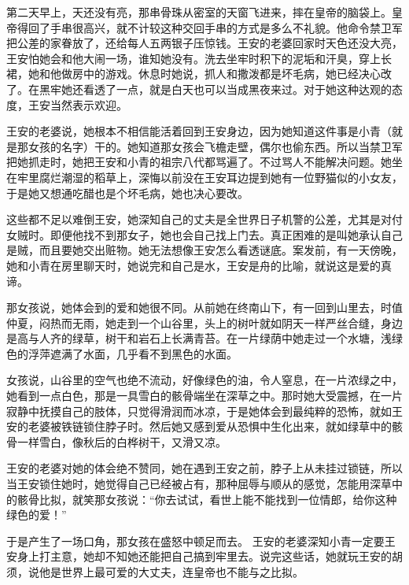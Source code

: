 第二天早上，天还没有亮，那串骨珠从密室的天窗飞进来，摔在皇帝的脑袋上。皇帝得回了手串很高兴，就不计较这种交回手串的方式是多么不礼貌。他命令禁卫军把公差的家眷放了，还给每人五两银子压惊钱。王安的老婆回家时天色还没大亮，王安怕她会和他大闹一场，谁知她没有。洗去坐牢时积下的泥垢和汗臭，穿上长裙，她和他做房中的游戏。休息时她说，抓人和撒泼都是坏毛病，她已经决心改了。在黑牢她还看透了一点，就是白天也可以当成黑夜来过。对于她这种达观的态度，王安当然表示欢迎。 

王安的老婆说，她根本不相信能活着回到王安身边，因为她知道这件事是小青（就是那女孩的名字）干的。她知道那女孩会飞檐走壁，偶尔也偷东西。所以当禁卫军把她抓走时，她把王安和小青的祖宗八代都骂遍了。不过骂人不能解决问题。她坐在牢里腐烂潮湿的稻草上，深悔以前没在王安耳边提到她有一位野猫似的小女友，于是她又想通吃醋也是个坏毛病，她也决心要改。 

这些都不足以难倒王安，她深知自己的丈夫是全世界日子机警的公差，尤其是对付女贼时。即便他找不到那女子，她也会自己找上门去。真正困难的是叫她承认自己是贼，而且要她交出赃物。她无法想像王安怎么看透谜底。案发前，有一天傍晚，她和小青在房里聊天时，她说完和自己是水，王安是舟的比喻，就说这是爱的真谛。 

那女孩说，她体会到的爱和她很不同。从前她在终南山下，有一回到山里去，时值仲夏，闷热而无雨，她走到一个山谷里，头上的树叶就如阴天一样严丝合缝，身边是高与人齐的绿草，树干和岩石上长满青苔。在一片绿荫中她走过一个水塘，浅绿色的浮萍遮满了水面，几乎看不到黑色的水面。 

女孩说，山谷里的空气也绝不流动，好像绿色的油，令人窒息，在一片浓绿之中，她看到一点白色，那是一具雪白的骸骨端坐在深草之中。那时她大受震撼，在一片寂静中抚摸自己的肢体，只觉得滑润而冰凉，于是她体会到最纯粹的恐怖，就如王安的老婆被铁链锁住脖子时。然后她又感到爱从恐惧中生化出来，就如绿草中的骸骨一样雪白，像秋后的白桦树干，又滑又凉。 

王安的老婆对她的体会绝不赞同，她在遇到王安之前，脖子上从未挂过锁链，所以当王安锁住她时，她觉得自己已经被占有，那种屈辱与顺从的感觉，怎能用深草中的骸骨比拟，就笑那女孩说：“你去试试，看世上能不能找到一位情郎，给你这种绿色的爱！” 

于是产生了一场口角，那女孩在盛怒中顿足而去。 王安的老婆深知小青一定要王安身上打主意，她却不知她还能把自己搞到牢里去。说完这些话，她就玩王安的胡须，说他是世界上最可爱的大丈夫，连皇帝也不能与之比拟。
